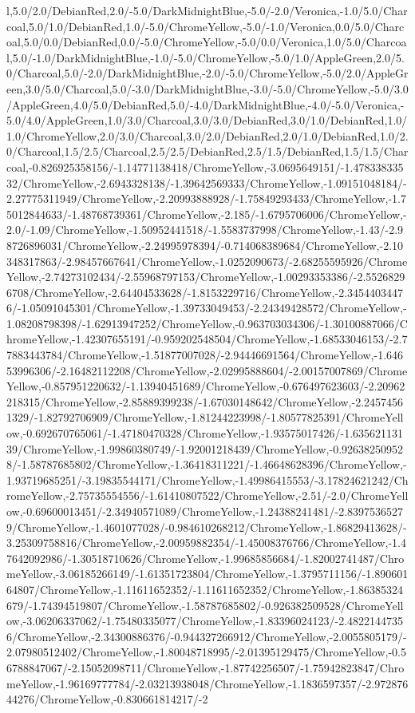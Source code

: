 {\begin{tikzternal}
l,5.0/2.0/DebianRed,2.0/-5.0/DarkMidnightBlue,-5.0/-2.0/Veronica,-1.0/5.0/Charcoal,5.0/1.0/DebianRed,1.0/-5.0/ChromeYellow,-5.0/-1.0/Veronica,0.0/5.0/Charcoal,5.0/0.0/DebianRed,0.0/-5.0/ChromeYellow,-5.0/0.0/Veronica,1.0/5.0/Charcoal,5.0/-1.0/DarkMidnightBlue,-1.0/-5.0/ChromeYellow,-5.0/1.0/AppleGreen,2.0/5.0/Charcoal,5.0/-2.0/DarkMidnightBlue,-2.0/-5.0/ChromeYellow,-5.0/2.0/AppleGreen,3.0/5.0/Charcoal,5.0/-3.0/DarkMidnightBlue,-3.0/-5.0/ChromeYellow,-5.0/3.0/AppleGreen,4.0/5.0/DebianRed,5.0/-4.0/DarkMidnightBlue,-4.0/-5.0/Veronica,-5.0/4.0/AppleGreen,1.0/3.0/Charcoal,3.0/3.0/DebianRed,3.0/1.0/DebianRed,1.0/1.0/ChromeYellow,2.0/3.0/Charcoal,3.0/2.0/DebianRed,2.0/1.0/DebianRed,1.0/2.0/Charcoal,1.5/2.5/Charcoal,2.5/2.5/DebianRed,2.5/1.5/DebianRed,1.5/1.5/Charcoal,-0.826925358156/-1.14771138418/ChromeYellow,-3.0695649151/-1.47833833532/ChromeYellow,-2.6943328138/-1.39642569333/ChromeYellow,-1.09151048184/-2.27775311949/ChromeYellow,-2.20993888928/-1.75849293433/ChromeYellow,-1.75012844633/-1.48768739361/ChromeYellow,-2.185/-1.6795706006/ChromeYellow,-2.0/-1.09/ChromeYellow,-1.50952441518/-1.5583737998/ChromeYellow,-1.43/-2.98726896031/ChromeYellow,-2.24995978394/-0.714068389684/ChromeYellow,-2.10348317863/-2.98457667641/ChromeYellow,-1.0252090673/-2.68255595926/ChromeYellow,-2.74273102434/-2.55968797153/ChromeYellow,-1.00293353386/-2.55268296708/ChromeYellow,-2.64404533628/-1.8153229716/ChromeYellow,-2.34544034476/-1.05091045301/ChromeYellow,-1.39733049453/-2.24349428572/ChromeYellow,-1.08208798398/-1.62913947252/ChromeYellow,-0.963703034306/-1.30100887066/ChromeYellow,-1.42307655191/-0.959202548504/ChromeYellow,-1.68533046153/-2.77883443784/ChromeYellow,-1.51877007028/-2.94446691564/ChromeYellow,-1.64653996306/-2.16482112208/ChromeYellow,-2.02995888604/-2.00157007869/ChromeYellow,-0.857951220632/-1.13940451689/ChromeYellow,-0.676497623603/-2.20962218315/ChromeYellow,-2.85889399238/-1.67030148642/ChromeYellow,-2.24574561329/-1.82792706909/ChromeYellow,-1.81244223998/-1.80577825391/ChromeYellow,-0.692670765061/-1.47180470328/ChromeYellow,-1.93575017426/-1.63562113139/ChromeYellow,-1.99860380749/-1.92001218439/ChromeYellow,-0.926382509528/-1.58787685802/ChromeYellow,-1.36418311221/-1.46648628396/ChromeYellow,-1.93719685251/-3.19835544171/ChromeYellow,-1.49986415553/-3.17824621242/ChromeYellow,-2.75735554556/-1.61410807522/ChromeYellow,-2.51/-2.0/ChromeYellow,-0.69600013451/-2.34940571089/ChromeYellow,-1.24388241481/-2.83975365279/ChromeYellow,-1.4601077028/-0.984610268212/ChromeYellow,-1.86829413628/-3.25309758816/ChromeYellow,-2.00959882354/-1.45008376766/ChromeYellow,-1.47642092986/-1.30518710626/ChromeYellow,-1.99685856684/-1.82002741487/ChromeYellow,-3.06185266149/-1.61351723804/ChromeYellow,-1.3795711156/-1.89060164807/ChromeYellow,-1.11611652352/-1.11611652352/ChromeYellow,-1.86385324679/-1.74394519807/ChromeYellow,-1.58787685802/-0.926382509528/ChromeYellow,-3.06206337062/-1.75480335077/ChromeYellow,-1.83396024123/-2.48221447356/ChromeYellow,-2.34300886376/-0.944327266912/ChromeYellow,-2.0055805179/-2.07980512402/ChromeYellow,-1.80048718995/-2.01395129475/ChromeYellow,-0.56788847067/-2.15052098711/ChromeYellow,-1.87742256507/-1.75942823847/ChromeYellow,-1.96169777784/-2.03213938048/ChromeYellow,-1.1836597357/-2.97287644276/ChromeYellow,-0.830661814217/-2
\end{tikzternal}}
